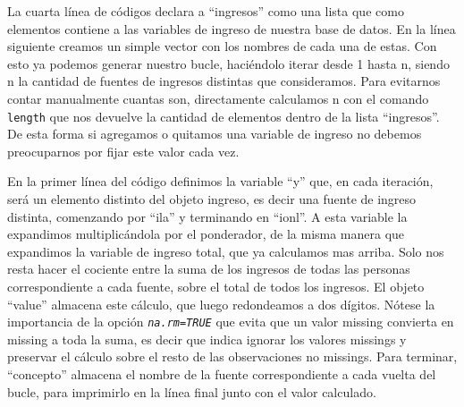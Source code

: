 \documentclass[
]{book}
\begin{document}
La cuarta línea de códigos declara a ``ingresos'' como una lista que como elementos contiene a las variables de ingreso de nuestra base de datos. En la línea siguiente creamos un simple vector con los nombres de cada una de estas. Con esto ya podemos generar nuestro bucle, haciéndolo iterar desde 1 hasta n, siendo n la cantidad de fuentes de ingresos distintas que consideramos. Para evitarnos contar manualmente cuantas son, directamente calculamos n con el comando \texttt{length} que nos devuelve la cantidad de elementos dentro de la lista ``ingresos''. De esta forma si agregamos o quitamos una variable de ingreso no debemos preocuparnos por fijar este valor cada vez.

En la primer línea del código definimos la variable ``y'' que, en cada iteración, será un elemento distinto del objeto ingreso, es decir una fuente de ingreso distinta, comenzando por ``ila'' y terminando en ``ionl''. A esta variable la expandimos multiplicándola por el ponderador, de la misma manera que expandimos la variable de ingreso total, que ya calculamos mas arriba. Solo nos resta hacer el cociente entre la suma de los ingresos de todas las personas correspondiente a cada fuente, sobre el total de todos los ingresos. El objeto ``value'' almacena este cálculo, que luego redondeamos a dos dígitos. Nótese la importancia de la opción \emph{\texttt{na.rm=TRUE}} que evita que un valor missing convierta en missing a toda la suma, es decir que indica ignorar los valores missings y preservar el cálculo sobre el resto de las observaciones no missings. Para terminar, ``concepto'' almacena el nombre de la fuente correspondiente a cada vuelta del bucle, para imprimirlo en la línea final junto con el valor calculado.
\end{document}
